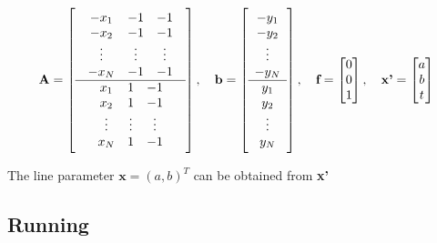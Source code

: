 \documentclass[paper=a4, fontsize=11pt]{scrartcl} %
\numberwithin{equation}{section} %
\numberwithin{figure}{section} %
\numberwithin{table}{section} %
\renewcommand{\vec}[1]{\mathbf{#1}}
\begin{document}
\begin{gather*}
\textbf{A} = \left[
\begin{array}{c}
    \begin{array}{c c c}
        -x_{1}	&	-1	&	-1\\
        -x_{2}	&	-1	&	-1\\
        \vdots	& \vdots	&	\vdots \\
        -x_{N}	&	-1	&	-1
    \end{array} \\
    \hline 
    \begin{array}{c c c}
        x_{1}	&	1	&	-1\\
        x_{2}	&	1	&	-1\\
        \vdots	& \vdots	&	\vdots \\
        x_{N}	&	1	&	-1
    \end{array}
\end{array} \right],
\quad \textbf{b} = \left[
\begin{array}{c}
    -y_{1}	\\
    -y_{2}	\\
    \vdots	\\
    -y_{N}	\\
    \hline	
    y_{1}	\\
    y_{2}	\\
    \vdots	\\
    y_{N}
\end{array} \right], 
\quad \textbf{f} = 
    \begin{bmatrix}
    0\\
    0\\
    1
    \end{bmatrix}, 
\quad \textbf{x'} = 
    \begin{bmatrix}
    a\\
    b\\
    t
    \end{bmatrix}
\end{gather*}

The line parameter $\vec{x} = (a, b)^{T}$ can be obtained from \textbf{x'}

\subsection{Running}
\end{document}
